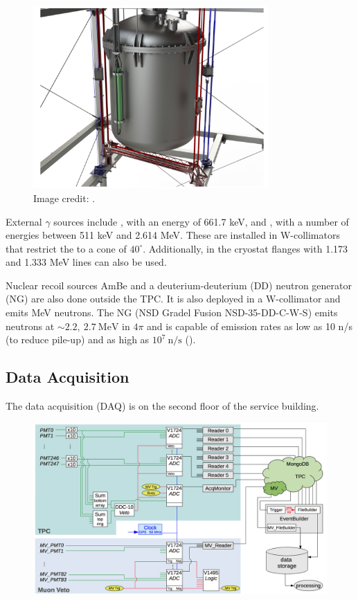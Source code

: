 \begin{figure}
\centering
\includegraphics[width=0.8\textwidth]{TPCCalibrations}
\caption{Image credit: .}
\label{fig:xenon1t_calibrations_belts}
\end{figure}

External $\gamma$ sources include , with an energy of 661.7 keV, and , with a number of energies between 511 keV
and 2.614 MeV.  These are installed in W-collimators that restrict the \gammarays to a cone of $40^{\circ}$.  Additionally, 
in the cryostat flanges with 1.173 and 1.333 MeV lines can also be used.

Nuclear recoil sources AmBe and a deuterium-deuterium (DD) neutron generator (NG) are also done outside the TPC.  It is also deployed in a
W-collimator and emits MeV neutrons.  The NG (NSD Gradel Fusion NSD-35-DD-C-W-S) emits neutrons at ${\sim} 2.2,\ 2.7\ \mathrm{MeV}$ in
$4\pi$ and is capable of emission rates as low as 10 n/s (to reduce pile-up) and as high as $10^{7}\ \mathrm{n/s}$ ().



\subsection{Data Acquisition}
\label{sec:xenon1t_daq}
The data acquisition (DAQ) is on the second floor of the service building.

\begin{figure}
\centering
\includegraphics[width=\textwidth]{DAQ}
\label{fig:xenon1t_daq_schematic}
\end{figure}

